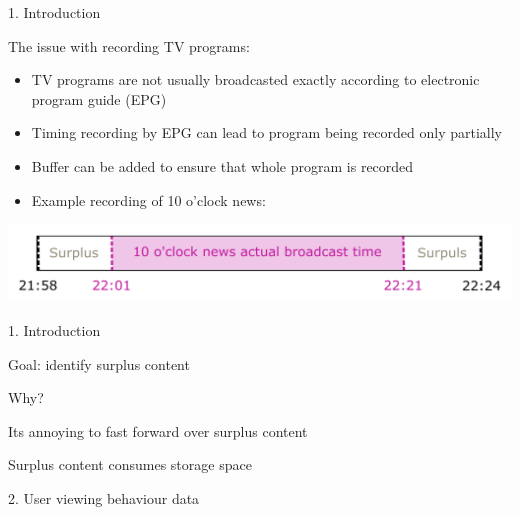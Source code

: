 \documentclass[first=orange,second=blue,logo=blueque]{aaltoslides}
\newcommand{\SubItem}[1]{
    {\setlength\itemindent{15pt} \item[$\bullet$] #1}
}
\begin{document}

\begin{frame}{1. Introduction}
    \begin{block}{{\color{black}The issue with recording TV programs:}}
        \begin{itemize}
            \item TV programs are not usually broadcasted exactly according to electronic program guide (EPG)
            \item Timing recording by EPG can lead to program being recorded only partially
            \item Buffer can be added to ensure that whole program is recorded
            \item Example recording of 10 o'clock news:
        \end{itemize}
        \center
        \includegraphics[width=1\textwidth]{figures/recording1.pdf}
    \end{block}
\end{frame}
    

\begin{frame}{1. Introduction}
    \begin{block}{{\color{black}}}
        \begin{itemize}
            \item Goal: identify surplus content
            \item Why?
                \SubItem{Its annoying to fast forward over surplus content}
                \SubItem{Surplus content consumes storage space}
        \end{itemize}
    \end{block}
\end{frame}
        

\begin{frame}{2. User viewing behaviour data}
\end{frame}
\end{document}
